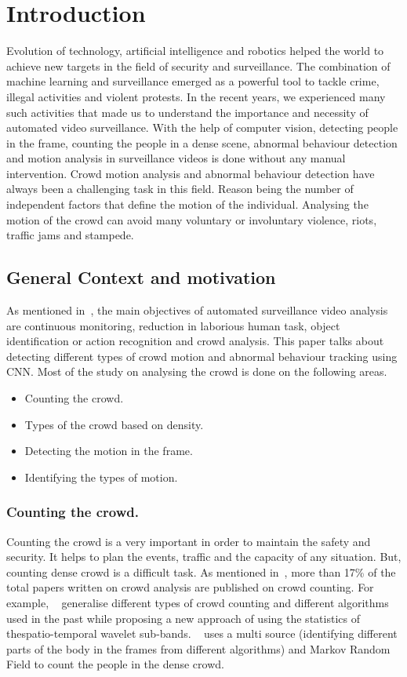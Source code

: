 \chapter{Introduction}
Evolution of technology, artificial intelligence and robotics helped the world to achieve new targets in the
field of security and surveillance. The combination of machine learning and surveillance emerged as a
powerful tool to tackle crime, illegal activities and violent protests. In the recent years, we experienced 
many such activities that made us to understand the importance and necessity of automated video 
surveillance. With the help of computer vision, detecting people in the frame, counting the people in a 
dense scene, abnormal behaviour detection and motion analysis in surveillance videos is done without 
any manual intervention. Crowd motion analysis and abnormal behaviour detection have always been a 
challenging task in this field. Reason being the number of independent factors that define the motion of 
the individual. Analysing the motion of the crowd can avoid many voluntary or involuntary violence, riots, 
traffic jams and stampede.
\section{General Context and motivation}
As mentioned in~\cite{sreenu2019intelligent}, the main objectives of automated surveillance video 
analysis are continuous monitoring, reduction in laborious human task, object identification or action 
recognition and crowd analysis. This paper talks about detecting different types of crowd motion and 
abnormal behaviour tracking using CNN. Most of the study on analysing the crowd is done on the 
following areas.
\begin{itemize}
	\item Counting the crowd.
	\item Types of the crowd based on density.
	\item Detecting the motion in the frame.
	\item Identifying the types of motion.
\end{itemize}

\subsection{Counting the crowd.}
Counting the crowd is a very important in order to maintain the safety and security. It helps to plan the 
events, traffic and the capacity of any situation. But, counting dense crowd is a difficult task. As 
mentioned in~\cite{tripathi2019convolutional}, more than 17\% of the total papers written on crowd 
analysis are published on crowd counting. For example, ~\cite{8462345} generalise different types of 
crowd counting and different algorithms used in the past while proposing a new approach of using the 
statistics of thespatio-temporal wavelet sub-bands. ~\cite{idrees2013multi} uses a multi source 
(identifying different parts of the body in the frames from different algorithms) and Markov Random Field 
to count the people in the dense crowd.
